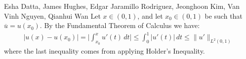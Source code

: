 

\begin{solution}{Esha Datta, James Hughes, Edgar Jaramillo Rodriguez, Jeonghoon Kim, Van Vinh Nguyen, Qianhui Wan}
        Let $x\in (0,1)$, and let $x_0\in (0,1)$ be such that $\overline{u} = u(x_0)$. By the Fundamental Theorem of Calculus we have:
        \begin{equation*}
            \begin{split}
                |u(x)-u(x_0)| = \bigg| \int_{x_0}^x u'(t)\,dt \bigg| \leq \int_0^1 
                |u'(t)|\,dt  \leq \lVert u' \rVert_{L^2(0,1)}
            \end{split}
        \end{equation*}
        where the last inequality comes from applying Holder's Inequality.
\end{solution}

